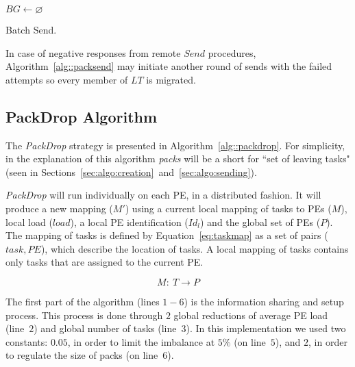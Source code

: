 \begin{algorithm}[t]
    \DontPrintSemicolon
    $BG \gets \varnothing$ \\
    \caption{Batch Send.}  
    \label{alg::packsend}
\end{algorithm}

In case of negative responses from remote $Send$ procedures, Algorithm~\ref{alg::packsend} may initiate another round of sends with the failed attempts so every member of $LT$ is migrated.

\subsection{PackDrop Algorithm} \label{sec:algo:main}

The \textit{PackDrop} strategy is presented in Algorithm~\ref{alg::packdrop}.
For simplicity, in the explanation of this algorithm \textit{packs} will be a short for ``set of leaving tasks" (seen in Sections~\ref{sec:algo:creation}~and~\ref{sec:algo:sending}).

\textit{PackDrop} will run individually on each PE, in a distributed fashion. 
It will produce a new mapping ($M'$) using a current local mapping of tasks to PEs ($M$), local load ($load$), a local PE identification ($Id_l$) and the global set of PEs ($P$).
The mapping of tasks is defined by Equation~\ref{eq:taskmap} as a set of pairs ($task, PE$), which describe the location of tasks.
A local mapping of tasks contains only tasks that are assigned to the current PE.

\begin{equation}
	M:\ T \rightarrow P
	\label{eq:taskmap}
\end{equation}

The first part of the algorithm (lines $1-6$) is the information sharing and setup process. 
This process is done through $2$ global reductions of average PE load (line~$2$) and global number of tasks (line~$3$).
In this implementation we used two constants: $0.05$, in order to limit the imbalance at $5\%$ (on line~$5$), and $2$, in order to regulate the size of packs (on line~$6$).

